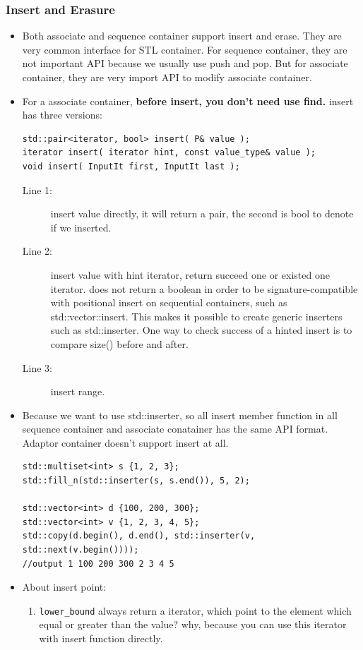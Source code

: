 \documentclass[a4paper,11pt,twoside]{book}
\begin{document}
\subsubsection{Insert and Erasure}
\begin{itemize}
\item Both associate and sequence container support insert and erase. They are very common interface for STL container. For sequence container, they are not important API because we usually use push and pop. But for associate container, they are very import API to modify associate container. 

\item For a associate container, \textbf{before insert, you don't need use find.} insert has three versions:
\begin{lstlisting}[numbers=none]
std::pair<iterator, bool> insert( P& value ); 
iterator insert( iterator hint, const value_type& value );
void insert( InputIt first, InputIt last );
\end{lstlisting}
\begin{description}
	\item[Line 1:] insert value directly, it will return a pair, the second is bool to denote if we inserted.
	\item[Line 2:] insert value with hint iterator, return succeed one or existed one iterator. does not return a boolean in order to be signature-compatible with positional insert on sequential containers, such as std::vector::insert. This makes it possible to create generic inserters such as std::inserter. One way to check success of a hinted insert is to compare size() before and after.
	\item[Line 3:] insert range.
\end{description}

\item Because we want to use std::inserter, so all insert member function in all sequence container and associate conatainer has the same API format. Adaptor container doesn't support insert at all. 
\begin{lstlisting}[numbers=none]
std::multiset<int> s {1, 2, 3};
std::fill_n(std::inserter(s, s.end()), 5, 2);	

std::vector<int> d {100, 200, 300};
std::vector<int> v {1, 2, 3, 4, 5};
std::copy(d.begin(), d.end(), std::inserter(v, std::next(v.begin())));
//output 1 100 200 300 2 3 4 5
\end{lstlisting}

\item About insert point:
\begin{enumerate}
	\item \texttt{lower\_bound} always return a iterator, which point to the element which equal or greater than the value? why, because you can use this iterator with insert function directly.
	

\end{enumerate}
\end{itemize}
\end{document}
